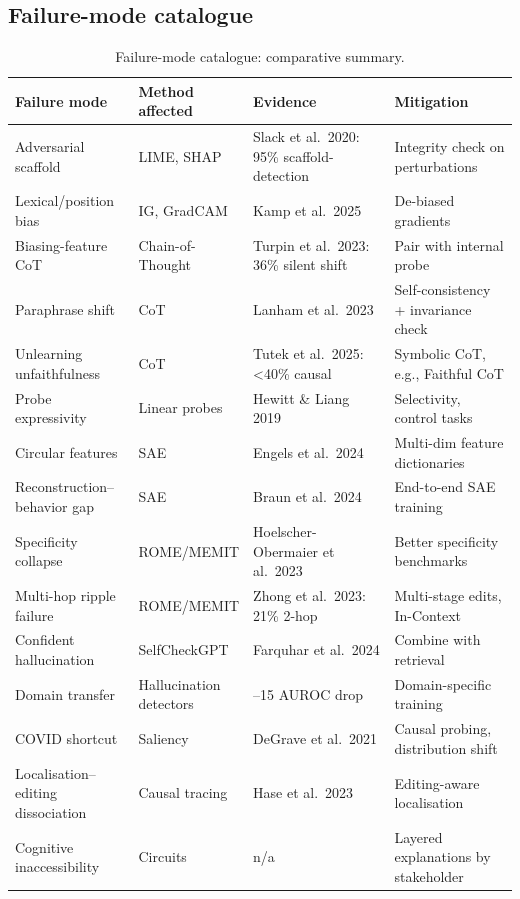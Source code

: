 \documentclass{article}
\begin{document}
\subsection{Failure-mode catalogue}\label{failure-mode-catalogue}

\begin{table}[t]
\centering
\caption{Failure-mode catalogue: comparative summary.}
\label{tab:failure-mode-catalogue}
\begin{tabular}{>{\raggedright\arraybackslash}p{0.2500\linewidth}
  >{\raggedright\arraybackslash}p{0.1742\linewidth}
  >{\raggedright\arraybackslash}p{0.3106\linewidth}
  >{\raggedright\arraybackslash}p{0.2652\linewidth}}
\toprule
Failure mode & Method affected & Evidence & Mitigation \\
\midrule
Adversarial scaffold & LIME, SHAP & Slack et al.~2020: 95\% scaffold-detection & Integrity check on perturbations \\
Lexical/position bias & IG, GradCAM & Kamp et al.~2025 & De-biased gradients \\
Biasing-feature CoT & Chain-of-Thought & Turpin et al.~2023: 36\% silent shift & Pair with internal probe \\
Paraphrase shift & CoT & Lanham et al.~2023 & Self-consistency + invariance check \\
Unlearning unfaithfulness & CoT & Tutek et al.~2025: \textless40\% causal & Symbolic CoT, e.g., Faithful CoT \\
Probe expressivity & Linear probes & Hewitt \& Liang 2019 & Selectivity, control tasks \\
Circular features & SAE & Engels et al.~2024 & Multi-dim feature dictionaries \\
Reconstruction--behavior gap & SAE & Braun et al.~2024 & End-to-end SAE training \\
Specificity collapse & ROME/MEMIT & Hoelscher-Obermaier et al.~2023 & Better specificity benchmarks \\
Multi-hop ripple failure & ROME/MEMIT & Zhong et al.~2023: 21\% 2-hop & Multi-stage edits, In-Context \\
Confident hallucination & SelfCheckGPT & Farquhar et al.~2024 & Combine with retrieval \\
Domain transfer & Hallucination detectors & 8--15 AUROC drop & Domain-specific training \\
COVID shortcut & Saliency & DeGrave et al.~2021 & Causal probing, distribution shift \\
Localisation--editing dissociation & Causal tracing & Hase et al.~2023 & Editing-aware localisation \\
Cognitive inaccessibility & Circuits & n/a & Layered explanations by stakeholder \\
\end{tabular}
\end{table}
\end{document}
